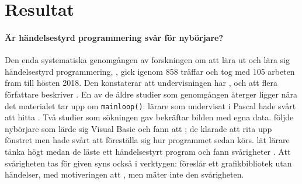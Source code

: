 \section{Resultat}
\label{sec:handelser-resultat-grafik}

\paragraph{Är händelsestyrd programmering svår för nybörjare?}  Den
enda systematiska genomgången av forskningen om att lära ut och lära
sig händelsestyrd programmering, \textcite{Lukkarinen2021Mapping}, gick
igenom 858 träffar och tog med 105 arbeten fram till hösten 2018.
Den konstaterar att undervisningen har
, och att flera författare beskriver
.  En av de äldre studier som
genomgången återger ligger nära det materialet tar upp om
\texttt{mainloop()}: lärare som undervisat i Pascal hade
svårt att hitta .  Två studier som sökningen
gav bekräftar bilden med egna data.  \Textcite{Shackleton1998} följde
nybörjare som lärde sig Visual Basic och fann att
; de
klarade att rita upp fönstret men hade svårt att föreställa sig hur
programmet sedan körs.  \Textcite{WiedenbeckEngebretson2004} lät lärare
tänka högt medan de läste ett händelsestyrt program och fann svårigheter
.  Att
svårigheten tas för given syns också i verktygen: \textcite{Mackin2013}
föreslår ett grafikbibliotek utan händelser, med motiveringen att
, men mäter inte den svårigheten.

